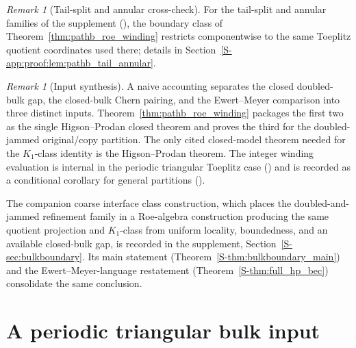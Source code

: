 \documentclass[11pt]{article}
\numberwithin{equation}{section}
\theoremstyle{definition}
\theoremstyle{remark}
\newtheorem{remark}[theorem]{Remark}
\begin{document}
\begin{remark}[Tail-split and annular cross-check]\label{lem:pathb_tail_annular}
For the tail-split and annular families of the supplement
(), the boundary class of
Theorem~\ref{thm:pathb_roe_winding} restricts componentwise to the same Toeplitz quotient
coordinates used there; details in Section~\ref{S-app:proof:lem:pathb_tail_annular}.
\end{remark}

\begin{remark}[Input synthesis]\label{rem:pathb_synthesis}
A naive accounting separates the closed doubled-bulk gap, the closed-bulk Chern pairing, and the
Ewert--Meyer comparison into three distinct inputs. Theorem~\ref{thm:pathb_roe_winding} packages
the first two as the single Higson--Prodan closed theorem and proves the third for the
doubled-jammed original/copy partition. The only cited closed-model theorem needed for the
\(K_1\)-class identity is the Higson--Prodan theorem. The integer winding evaluation is
internal in the periodic triangular Toeplitz case () and is
recorded as a conditional corollary for general partitions
().
\end{remark}

The companion coarse interface class construction, which places the doubled-and-jammed refinement
family in a Roe-algebra construction producing the same quotient projection and \(K_1\)-class
from uniform locality, boundedness, and an available closed-bulk gap, is recorded in the
supplement, Section~\ref{S-sec:bulkboundary}. Its main statement
(Theorem~\ref{S-thm:bulkboundary_main}) and the Ewert--Meyer-language restatement
(Theorem~\ref{S-thm:full_hp_bec}) consolidate the same conclusion.

\section{A periodic triangular bulk input}\label{sec:periodicbulk}
\end{document}
